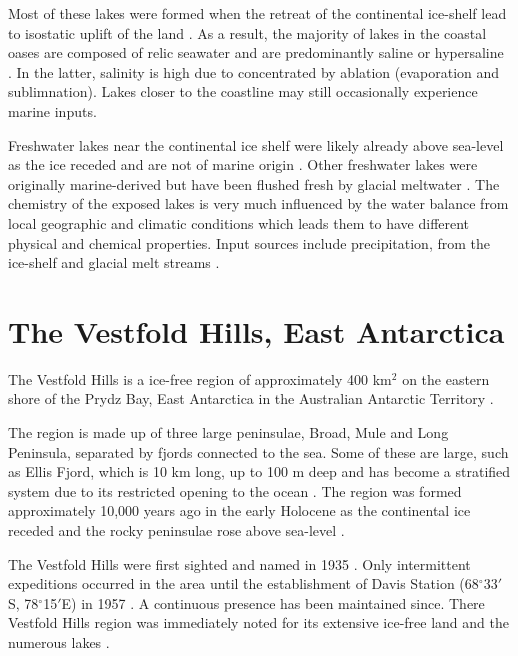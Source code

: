 Most of these lakes were formed when the retreat of the continental ice-shelf lead to isostatic uplift of the land \cite{Burton1981}. %
As a result, the majority of lakes in the coastal oases are composed of relic seawater and are predominantly saline or hypersaline \cite{Burke1988}.
In the latter, salinity is high due to concentrated by ablation (evaporation and sublimnation). %
Lakes closer to the coastline may still occasionally experience marine inputs. %


Freshwater lakes near the continental ice shelf were likely already above sea-level as the ice receded and are not of marine origin \cite{Bronge1996}. %
Other freshwater lakes were originally marine-derived but have been flushed fresh by glacial meltwater \cite{Pickard1986}.
The chemistry of the exposed lakes is very much influenced by the water balance from local geographic and climatic conditions which leads them to have different physical and chemical properties.
Input sources include precipitation, from the ice-shelf and glacial melt streams \cite{Burton1981}. 



\section{The Vestfold Hills, East Antarctica}
The Vestfold Hills  is a ice-free region of approximately 400 km$^2$ on the eastern shore of the Prydz Bay, East Antarctica in the Australian Antarctic Territory \cite{Gibson1999}.

The region is made up of three large peninsulae, Broad, Mule and Long Peninsula, separated by fjords connected to the sea.
Some of these are large, such as Ellis Fjord, which is 10 km long, up to 100 m deep and has become a stratified system due to its restricted opening to the ocean \cite{Burke1988}.
The region was formed approximately 10,000 years ago in the early Holocene as the continental ice receded and the rocky peninsulae rose above sea-level \cite{Zwartz1998}. 

The Vestfold Hills were first sighted and named in 1935 \cite{Law1959}.
Only intermittent expeditions occurred in the area until the establishment of Davis Station (68$^{\circ}$33$'$S, 78$^{\circ}$15$'$E) in 1957 \cite{Law1959}. 
A continuous presence has been maintained since. %
There Vestfold Hills region was immediately noted for its extensive ice-free land and the numerous lakes \cite{Johnstone1973}.

